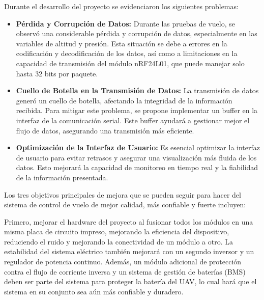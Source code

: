 Durante el desarrollo del proyecto se evidenciaron los siguientes problemas:\vspace{5px}
\begin{itemize}
    \item \textbf{Pérdida y Corrupción de Datos:} Durante las pruebas de vuelo, se observó una considerable pérdida y corrupción de datos, especialmente en las variables de altitud y presión. Esta situación se debe a errores en la codificación y decodificación de los datos, así como a limitaciones en la capacidad de transmisión del módulo nRF24L01, que puede manejar solo hasta 32 bits por paquete.\vspace{5px}
    
    \item \textbf{Cuello de Botella en la Transmisión de Datos:} La transmisión de datos generó un cuello de botella, afectando la integridad de la información recibida. Para mitigar este problema, se propone implementar un buffer en la interfaz de la comunicación serial. Este buffer ayudará a gestionar mejor el flujo de datos, asegurando una transmisión más eficiente.\vspace{5px}
    
    \item \textbf{Optimización de la Interfaz de Usuario:} Es esencial optimizar la interfaz de usuario para evitar retrasos y asegurar una visualización más fluida de los datos. Esto mejorará la capacidad de monitoreo en tiempo real y la fiabilidad de la información presentada.\vspace{5px}

\end{itemize}


Los tres objetivos principales de mejora que se pueden seguir para hacer del sistema de control de vuelo de mejor calidad, más confiable y fuerte incluyen:\vspace{5px}

Primero, mejorar el hardware del proyecto al fusionar todos los módulos en una misma placa de circuito impreso, mejorando la eficiencia del dispositivo, reduciendo el ruido y mejorando la conectividad de un módulo a otro. La estabilidad del sistema eléctrico también mejorará con un segundo inversor y un regulador de potencia continuo. Además, un módulo adicional de protección contra el flujo de corriente inversa y un sistema de gestión de baterías (BMS) deben ser parte del sistema para proteger la batería del UAV, lo cual hará que el sistema en su conjunto sea aún más confiable y duradero.\vspace{5px}

